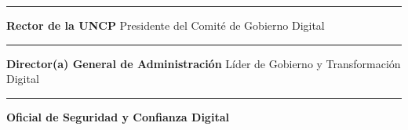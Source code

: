 \documentclass[10pt,letterpaper]{article}
\begin{document}
\begin{center}\rule{0.5\linewidth}{0.5pt}\end{center}

\textbf{Rector de la UNCP} Presidente del Comité de Gobierno Digital

\begin{center}\rule{0.5\linewidth}{0.5pt}\end{center}

\textbf{Director(a) General de Administración} Líder de Gobierno y
Transformación Digital

\begin{center}\rule{0.5\linewidth}{0.5pt}\end{center}

\textbf{Oficial de Seguridad y Confianza Digital}
\end{document}
